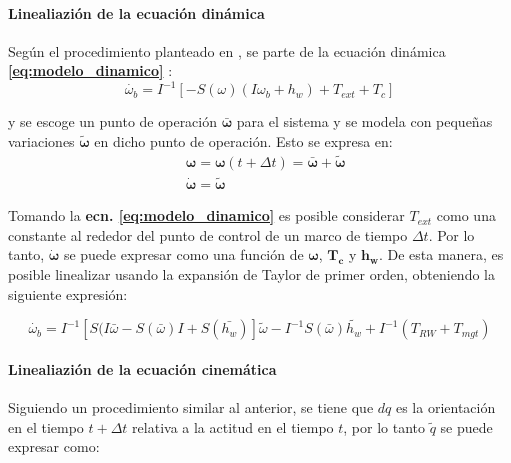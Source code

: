 \paragraph{Linealiazión de la ecuación dinámica}
\hfill \break
Según el procedimiento planteado en \cite{Andresen2005}, se parte de la ecuación dinámica \textbf{\eqref{eq:modelo_dinamico}} :
$$
 \dot{\omega_b}=I^{-1}\left[-S(\omega)\left(I \omega_b+h_w\right)+T_{ext}+T_c\right]
$$

y se escoge un punto de operación $\boldsymbol{\bar{\omega}}$ para el sistema y se modela con pequeñas variaciones $\boldsymbol{\tilde{\omega}}$ en dicho punto de operación. Esto se expresa en:
\begin{equation}
	\begin{aligned}
		& \boldsymbol{\omega} = \boldsymbol{\omega}(t+\Delta t) = \boldsymbol{\bar{\omega}} + \boldsymbol{\tilde{\omega}}\\
		& \boldsymbol{\dot{\omega}} = \boldsymbol{\tilde{\omega}}
	\end{aligned}	 
\end{equation}

Tomando la \textbf{ecn. \eqref{eq:modelo_dinamico}} es posible considerar $T_{ext}$ como una constante al rededor del punto de control de un marco de tiempo $\Delta t$. Por lo tanto, $\boldsymbol{\dot{\omega}}$ se puede expresar como una función de $\boldsymbol{\omega}$, $\boldsymbol{T_c}$ y $\boldsymbol{h_w}$. De esta manera, es posible linealizar usando la expansión de Taylor de primer orden, obteniendo la siguiente expresión:

\begin{equation}\label{eq:modelo_dinamico_linealizado}
	\dot{\omega_b}=I^{-1}\left[S(I\bar{\omega}-S(\bar{\omega})I+S(\bar{h_w})\right]\tilde{\omega}-I^{-1}S(\bar{\omega})\tilde{h_w}+I^{-1}\left(T_{RW}+T_{mgt}\right)
\end{equation}

\paragraph{Linealiazión de la ecuación cinemática}
\hfill \break
Siguiendo un procedimiento similar al anterior, se tiene que $dq$ es la orientación en el tiempo $t +\Delta t$ relativa a la actitud en el tiempo $t$, por lo tanto $\tilde{q}$ se puede expresar como:
 
